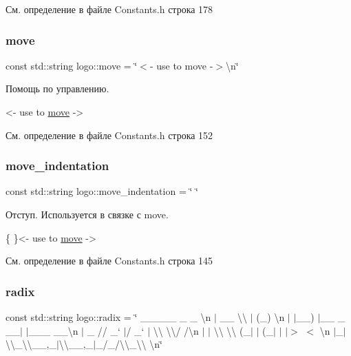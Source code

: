 См. определение в файле Constants.\+h строка 178

\mbox{\label{namespacelogo_a03b6b80b5648e7dbbbf00b258df733b6}} 
\subsubsection{\texorpdfstring{move}{move}}
{\footnotesize\ttfamily const std\+::string logo\+::move = \char`\"{}$<$-\/ use to move -\/$>$\textbackslash{}n\char`\"{}}

Помощь по управлению. 
\begin{DoxyCode}
<- use to \hyperlink{namespacelogo_a03b6b80b5648e7dbbbf00b258df733b6}{move} ->
\end{DoxyCode}
 

См. определение в файле Constants.\+h строка 152

\mbox{\label{namespacelogo_a7570bf74bf945a06ced26f6fccaeab53}} 
\subsubsection{\texorpdfstring{move\+\_\+indentation}{move\_indentation}}
{\footnotesize\ttfamily const std\+::string logo\+::move\+\_\+indentation = \char`\"{} \char`\"{}}

Отступ. Используется в связке с move. 
\begin{DoxyCode}
\{       \}<- use to \hyperlink{namespacelogo_a03b6b80b5648e7dbbbf00b258df733b6}{move} ->
\end{DoxyCode}
 

См. определение в файле Constants.\+h строка 145

\mbox{\label{namespacelogo_abbbdbfbbcae50e2017f3ed1bdf0e1fa3}} 
\subsubsection{\texorpdfstring{radix}{radix}}
{\footnotesize\ttfamily const std\+::string logo\+::radix = \char`\"{} \+\_\+\+\_\+\+\_\+\+\_\+\+\_\+ \+\_\+ \+\_\+ \textbackslash{}n $\vert$ \+\_\+\+\_\+ \textbackslash{}\textbackslash{} $\vert$ (\+\_\+) \textbackslash{}n $\vert$ $\vert$\+\_\+\+\_\+) $\vert$\+\_\+\+\_\+ \+\_\+ \+\_\+\+\_\+$\vert$ $\vert$\+\_\+\+\_\+\+\_\+ \+\_\+\+\_\+\textbackslash{}n $\vert$ \+\_\+ // \+\_\+` $\vert$/ \+\_\+` $\vert$ \textbackslash{}\textbackslash{} \textbackslash{}\textbackslash{}/ /\textbackslash{}n $\vert$ $\vert$ \textbackslash{}\textbackslash{} \textbackslash{}\textbackslash{} (\+\_\+$\vert$ $\vert$ (\+\_\+$\vert$ $\vert$ $\vert$$>$ $<$ \textbackslash{}n $\vert$\+\_\+$\vert$ \textbackslash{}\textbackslash{}\+\_\+\textbackslash{}\textbackslash{}\+\_\+\+\_\+,\+\_\+$\vert$\textbackslash{}\textbackslash{}\+\_\+\+\_\+,\+\_\+$\vert$\+\_\+/\+\_\+/\textbackslash{}\textbackslash{}\+\_\+\textbackslash{}\textbackslash{} \textbackslash{}n\char`\"{}}

